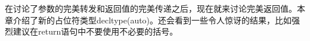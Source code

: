在讨论了参数的完美转发和返回值的完美传递之后，现在就来讨论完美返回值。本章介绍了新的占位符类型decltype(auto)。还会看到一些令人惊讶的结果，比如强烈建议在return语句中不要使用不必要的括号。\par